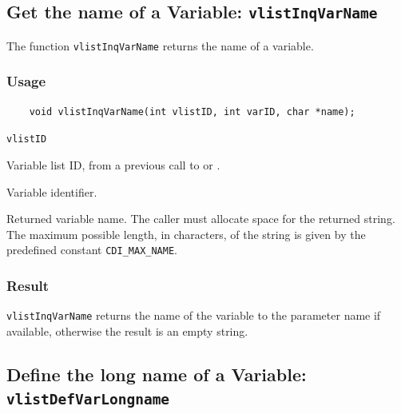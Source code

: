\subsection{Get the name of a Variable: \texttt{vlistInqVarName}}
\label{vlistInqVarName}

The function {\texttt{vlistInqVarName}} returns the name of a variable.

\subsubsection*{Usage}

\begin{verbatim}
    void vlistInqVarName(int vlistID, int varID, char *name);
\end{verbatim}

\hspace*{4mm}\begin{minipage}[]{15cm}
\begin{deflist}{\texttt{vlistID}\ }
\item[\texttt{vlistID}]
Variable list ID, from a previous call to {} or {}.
\item[\texttt{varID}]
Variable identifier.
\item[\texttt{name}]
Returned variable name. The caller must allocate space for the
                    returned string. The maximum possible length, in characters, of
                    the string is given by the predefined constant {\texttt{CDI\_MAX\_NAME}}.

\end{deflist}
\end{minipage}

\subsubsection*{Result}

{\texttt{vlistInqVarName}} returns the name of the variable to the parameter name if available,
otherwise the result is an empty string.



\subsection{Define the long name of a Variable: \texttt{vlistDefVarLongname}}
\label{vlistDefVarLongname}

